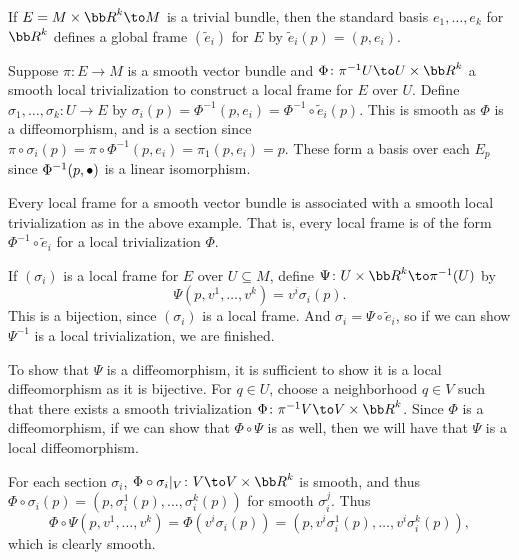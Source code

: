 \eproof

\bexam

    If $E=M\times\bR^k\to M$ is a trivial bundle, then the standard basis $e_1,\dots,e_k$ for $\bR^k$ defines a global frame $(\tilde e_i)$ for $E$ by
    $\tilde e_i(p)=(p,e_i)$.

\eexam

\bexam

    Suppose $\pi\colon E\to M$ is a smooth vector bundle and $\Phi\colon\pi^{-1}U\to U\times\bR^k$ a smooth local trivialization to construct a local frame
    for $E$ over $U$.
    Define $\sigma_1,\dots,\sigma_k\colon U\to E$ by $\sigma_i(p)=\Phi^{-1}(p,e_i)=\Phi^{-1}\circ\tilde e_i(p)$.
    This is smooth as $\Phi$ is a diffeomorphism, and is a section since $\pi\circ\sigma_i(p)=\pi\circ\Phi^{-1}(p,e_i)=\pi_1(p,e_i)=p$.
    These form a basis over each $E_p$ since $\Phi^{-1}(p,\bullet)$ is a linear isomorphism.

\eexam

\bprop

    Every local frame for a smooth vector bundle is associated with a smooth local trivialization as in the above example.
    That is, every local frame is of the form $\Phi^{-1}\circ\tilde e_i$ for a local trivialization $\Phi$.

\eprop

\bproof

    If $(\sigma_i)$ is a local frame for $E$ over $U\subseteq M$, define $\Psi\colon U\times\bR^k\to\pi^{-1}(U)$ by
    $$ \Psi(p,v^1,\dots,v^k) = v^i\sigma_i(p) . $$
    This is a bijection, since $(\sigma_i)$ is a local frame.
    And $\sigma_i=\Psi\circ\tilde e_i$, so if we can show $\Psi^{-1}$ is a local trivialization, we are finished.

    To show that $\Psi$ is a diffeomorphism, it is sufficient to show it is a local diffeomorphism as it is bijective.
    For $q\in U$, choose a neighborhood $q\in V$ such that there exists a smooth trivialization $\Phi\colon\pi^{-1}V\to V\times\bR^k$.
    Since $\Phi$ is a diffeomorphism, if we can show that $\Phi\circ\Psi$ is as well, then we will have that $\Psi$ is a local diffeomorphism.

    For each section $\sigma_i$, $\Phi\circ\sigma_i|_V\colon V\to V\times\bR^k$ is smooth, and thus $\Phi\circ\sigma_i(p)=(p,\sigma^1_i(p),\dots,\sigma^k_i(p))$
    for smooth $\sigma^j_i$.
    Thus
    $$ \Phi\circ\Psi(p,v^1,\dots,v^k) = \Phi(v^i\sigma_i(p)) = (p,v^i\sigma^1_i(p),\dots,v^i\sigma^k_i(p)) , $$
    which is clearly smooth.

